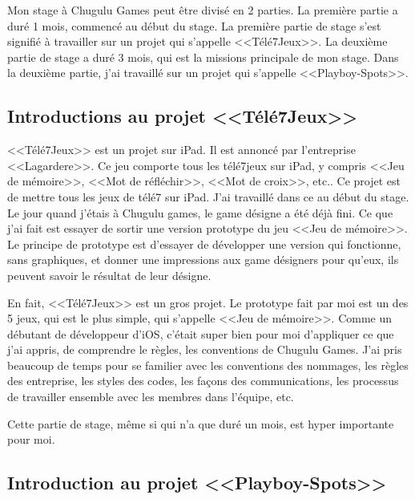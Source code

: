 Mon stage à Chugulu Games peut être divisé en 2 parties. La première partie a duré 1 mois, commencé au début du stage. La première partie de stage s'est signifié à travailler sur un projet qui s'appelle <<Télé7Jeux>>. La deuxième partie de stage a duré 3 mois, qui est la missions principale de mon stage. Dans la deuxième partie, j'ai travaillé sur un projet qui s'appelle <<Playboy-Spots>>.

\subsection{Introductions au projet <<Télé7Jeux>>} %
\label{ssub:introductions_au_projet_télé7jeux}


<<Télé7Jeux>> est un projet sur iPad. Il est annoncé par l'entreprise <<Lagardere>>. Ce jeu comporte tous les télé7jeux sur iPad, y compris <<Jeu de mémoire>>, <<Mot de réfléchir>>, <<Mot de croix>>, etc.. Ce projet est de mettre tous les jeux de télé7 sur iPad.
J'ai travaillé dans ce au début du stage. Le jour quand j'étais à Chugulu games, le game désigne a été déjà fini. Ce que j'ai fait est essayer de sortir une version prototype du jeu <<Jeu de mémoire>>. Le principe de prototype est d'essayer de développer une version qui fonctionne, sans graphiques, et donner une impressions aux game désigners pour qu'eux, ils peuvent savoir le résultat de leur désigne. 

En fait, <<Télé7Jeux>> est un gros projet. Le prototype fait par moi est un des 5 jeux, qui est le plus simple, qui s'appelle <<Jeu de mémoire>>. Comme un débutant de développeur d'iOS, c'était super bien pour moi d'appliquer ce que j'ai appris, de comprendre le règles, les conventions de Chugulu Games. J'ai pris beaucoup de temps pour se familier avec les conventions des nommages, les règles des entreprise, les styles des codes, les façons des communications, les processus de travailler ensemble avec les membres dans l'équipe, etc. 

Cette partie de stage, même si qui n'a que duré un mois, est hyper importante pour moi.


\subsection{Introduction au projet <<Playboy-Spots>>} %
\label{ssub:introduction_au_projet_playboy_s}

